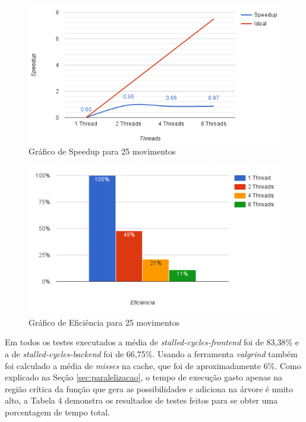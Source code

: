 \documentclass[12pt]{article}
\begin{document}
\begin{figure}[!ht]
\centering
\includegraphics[width=1\textwidth]{speedup25.png}
\caption{Gráfico de Speedup para 25 movimentos}
\label{fig:figura7}
\end{figure}

\begin{figure}[!ht]
\centering
\includegraphics[width=1\textwidth]{efic25.png}
\caption{Gráfico de Eficiência para 25 movimentos}
\label{fig:figura8}
\end{figure}

Em todos os testes executados a média de \textit{stalled-cycles-frontend} foi de 83,38\% e a de \textit{stalled-cycles-backend} foi de 66,75\%. Usando a ferramenta \textit{valgrind} também foi calculado a média de \textit{misses} na cache, que foi de aproximadamente 6\%. Como explicado na Seção \ref{sec:paralelizacao}, o tempo de execução gasto apenas na região crítica da função que gera as possibilidades e adiciona na árvore é muito alto, a Tabela 4 demonstra os resultados de testes feitos para se obter uma porcentagem de tempo total.
\end{document}
